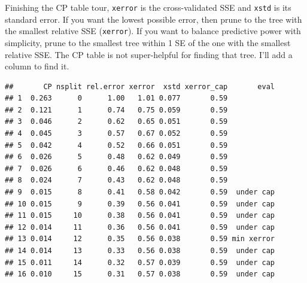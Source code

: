 \documentclass[
]{book}
\newenvironment{Shaded}{\begin{snugshade}}{\end{snugshade}}
\newcommand{\DataTypeTok}[1]{\textcolor[rgb]{0.13,0.29,0.53}{#1}}
\newcommand{\DecValTok}[1]{\textcolor[rgb]{0.00,0.00,0.81}{#1}}
\newcommand{\KeywordTok}[1]{\textcolor[rgb]{0.13,0.29,0.53}{\textbf{#1}}}
\newcommand{\NormalTok}[1]{#1}
\newcommand{\OperatorTok}[1]{\textcolor[rgb]{0.81,0.36,0.00}{\textbf{#1}}}
\newcommand{\OtherTok}[1]{\textcolor[rgb]{0.56,0.35,0.01}{#1}}
\newcommand{\StringTok}[1]{\textcolor[rgb]{0.31,0.60,0.02}{#1}}
\begin{document}
Finishing the CP table tour, \texttt{xerror} is the cross-validated SSE and \texttt{xstd} is its standard error. If you want the lowest possible error, then prune to the tree with the smallest relative SSE (\texttt{xerror}). If you want to balance predictive power with simplicity, prune to the smallest tree within 1 SE of the one with the smallest relative SSE. The CP table is not super-helpful for finding that tree. I'll add a column to find it.

\begin{Shaded}
\end{Shaded}

\begin{verbatim}
##       CP nsplit rel.error xerror  xstd xerror_cap       eval
## 1  0.263      0      1.00   1.01 0.077       0.59           
## 2  0.121      1      0.74   0.75 0.059       0.59           
## 3  0.046      2      0.62   0.65 0.051       0.59           
## 4  0.045      3      0.57   0.67 0.052       0.59           
## 5  0.042      4      0.52   0.66 0.051       0.59           
## 6  0.026      5      0.48   0.62 0.049       0.59           
## 7  0.026      6      0.46   0.62 0.048       0.59           
## 8  0.024      7      0.43   0.62 0.048       0.59           
## 9  0.015      8      0.41   0.58 0.042       0.59  under cap
## 10 0.015      9      0.39   0.56 0.041       0.59  under cap
## 11 0.015     10      0.38   0.56 0.041       0.59  under cap
## 12 0.014     11      0.36   0.56 0.041       0.59  under cap
## 13 0.014     12      0.35   0.56 0.038       0.59 min xerror
## 14 0.014     13      0.33   0.56 0.038       0.59  under cap
## 15 0.011     14      0.32   0.57 0.039       0.59  under cap
## 16 0.010     15      0.31   0.57 0.038       0.59  under cap
\end{verbatim}
\end{document}
